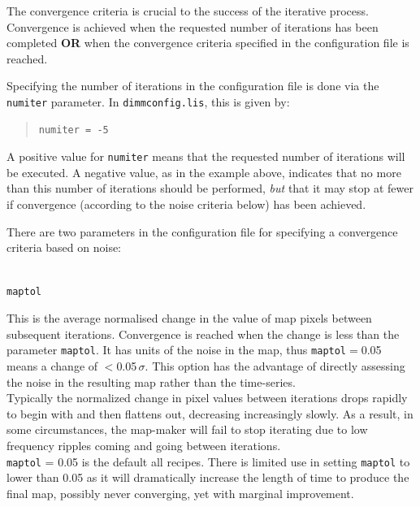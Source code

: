 \documentclass[twoside,11pt]{article}
\renewcommand{\_}{\texttt{\symbol{95}}}
\newenvironment{myquote}{\begin{quote}\begin{small}}{\end{small}\end{quote}}
\begin{document}
The convergence criteria is crucial to the success of the iterative
process. Convergence is achieved when the requested number of
iterations has been completed \textbf{OR} when the convergence
criteria specified in the configuration file is reached.

Specifying the number of iterations in the configuration file is done via
the \texttt{numiter} parameter. In \texttt{dimmconfig.lis}, this is given
by:
\vspace{-0.1cm}
\begin{myquote}
\begin{verbatim}
numiter = -5
\end{verbatim}
\end{myquote}
\vspace{-0.2cm}
A positive value for \texttt{numiter} means that the requested number
of iterations will be executed. A negative value, as in the example
above, indicates that no more than this number of iterations should be
performed, \emph{but} that it may stop at fewer if convergence
(according to the noise criteria below) has been achieved.

There are two parameters in the configuration file for specifying a
convergence criteria based on noise:
\\ \\
\begin{minipage}[t]{0.1\linewidth}
\texttt{maptol}
\end{minipage}
\begin{minipage}[t]{0.9\linewidth}
This is the average normalised change in the value of map pixels
between subsequent iterations. Convergence is reached when the change
is less than the parameter \texttt{maptol}. It has units of the noise
in the map, thus \texttt{maptol}$=$0.05 means a change of
$<$0.05\,$\sigma$. This option has the advantage of directly assessing
the noise in the resulting map rather than the time-series.
\vspace{3mm}\\
Typically the normalized change in pixel values between iterations
drops rapidly to begin with and then flattens out, decreasing
increasingly slowly. As a result, in some circumstances, the map-maker
will fail to stop iterating due to low frequency ripples coming and
going between iterations.
\vspace{3mm}\\
\texttt{maptol} = 0.05 is the default all recipes. There is limited
use in setting \texttt{maptol} to lower than 0.05 as it will
dramatically increase the length of time to produce the final map,
possibly never converging, yet with marginal improvement.
\end{minipage}
\vspace{2mm}
\end{document}
